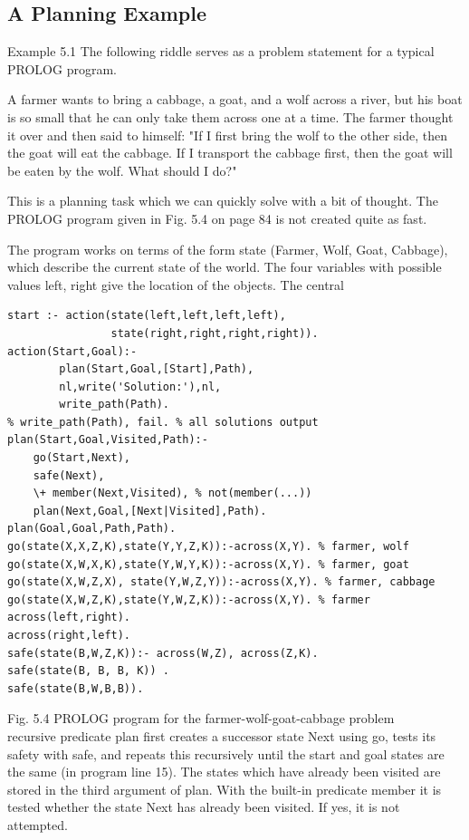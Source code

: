 \documentclass[10pt]{book}
\begin{document}
\subsection*{A Planning Example}
Example 5.1 The following riddle serves as a problem statement for a typical PROLOG program.

A farmer wants to bring a cabbage, a goat, and a wolf across a river, but his boat is so small that he can only take them across one at a time. The farmer thought it over and then said to himself: "If I first bring the wolf to the other side, then the goat will eat the cabbage. If I transport the cabbage first, then the goat will be eaten by the wolf. What should I do?"

This is a planning task which we can quickly solve with a bit of thought. The PROLOG program given in Fig. 5.4 on page 84 is not created quite as fast.

The program works on terms of the form state (Farmer, Wolf, Goat, Cabbage), which describe the current state of the world. The four variables with possible values left, right give the location of the objects. The central

\begin{verbatim}
start :- action(state(left,left,left,left),
                state(right,right,right,right)).
action(Start,Goal):-
        plan(Start,Goal,[Start],Path),
        nl,write('Solution:'),nl,
        write_path(Path).
% write_path(Path), fail. % all solutions output
plan(Start,Goal,Visited,Path):-
    go(Start,Next),
    safe(Next),
    \+ member(Next,Visited), % not(member(...))
    plan(Next,Goal,[Next|Visited],Path).
plan(Goal,Goal,Path,Path).
go(state(X,X,Z,K),state(Y,Y,Z,K)):-across(X,Y). % farmer, wolf
go(state(X,W,X,K),state(Y,W,Y,K)):-across(X,Y). % farmer, goat
go(state(X,W,Z,X), state(Y,W,Z,Y)):-across(X,Y). % farmer, cabbage
go(state(X,W,Z,K),state(Y,W,Z,K)):-across(X,Y). % farmer
across(left,right).
across(right,left).
safe(state(B,W,Z,K)):- across(W,Z), across(Z,K).
safe(state(B, B, B, K)) .
safe(state(B,W,B,B)).
\end{verbatim}

Fig. 5.4 PROLOG program for the farmer-wolf-goat-cabbage problem\\

recursive predicate plan first creates a successor state Next using go, tests its safety with safe, and repeats this recursively until the start and goal states are the same (in program line 15). The states which have already been visited are stored in the third argument of plan. With the built-in predicate member it is tested whether the state Next has already been visited. If yes, it is not attempted.
\end{document}
